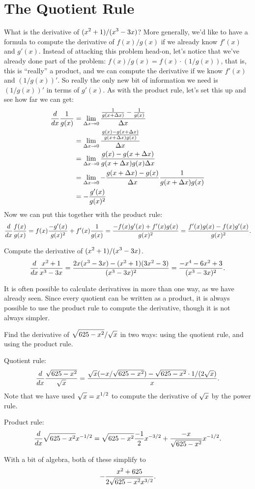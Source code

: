 \section{The Quotient Rule}{}{}
\nobreak
{}
What is the derivative of $\displaystyle (x^2+1)/(x^3-3x)$? More generally, we'd
like to have a formula to compute the derivative of $f(x)/g(x)$ if we
already know $f'(x)$ and $g'(x)$. Instead of attacking this problem
head-on, let's notice that we've already done part of the problem:
$f(x)/g(x)= f(x)\cdot(1/g(x))$, that is, this is ``really'' a product,
and we can compute the derivative if we know $f'(x)$ and
$(1/g(x))'$. So really the only new bit of information we need is
$(1/g(x))'$ in terms of $g'(x)$. As with the product rule, let's set
this up and see how far we can get:
\begin{align*}
{d\over dx}{1\over g(x)}&=\lim_{\Delta x\to0} 
{{1\over g(x+\Delta x)}-{1\over g(x)}\over\Delta x} \\
&=\lim_{\Delta x\to0} {{g(x)-g(x+\Delta x)\over g(x+\Delta x)g(x)}\over\Delta x} \\
&=\lim_{\Delta x\to0} {g(x)-g(x+\Delta x)\over g(x+\Delta x)g(x)\Delta x} \\
&=\lim_{\Delta x\to0} -{g(x+\Delta x)-g(x)\over \Delta x}
 {1\over g(x+\Delta x)g(x)} \\
&=-{g'(x)\over g(x)^2} \\
\end{align*}
Now we can put this together with the product rule:
$${d\over dx}{f(x)\over g(x)}=f(x){-g'(x)\over g(x)^2}+f'(x){1\over
  g(x)}={-f(x)g'(x)+f'(x)g(x)\over g(x)^2}=
  {f'(x)g(x)-f(x)g'(x)\over g(x)^2}.
$$

\begin{example}
Compute the derivative of $\displaystyle (x^2+1)/(x^3-3x)$.
$${d\over dx}{x^2+1\over
  x^3-3x}={2x(x^3-3x)-(x^2+1)(3x^2-3)\over(x^3-3x)^2}=
  {-x^4-6x^2+3\over (x^3-3x)^2}.
$$
\vskip-10pt
\end{example}

It is often possible to calculate derivatives in more than one way, as
we have already seen. Since every quotient can be written as a
product, it is always possible to use the product rule to compute the
derivative, though it is not always simpler.

\begin{example}
Find the derivative of $\displaystyle \sqrt{625-x^2}/\sqrt{x}$ in two ways: using the
quotient rule, and using the product rule.

Quotient rule:
$${d\over dx}{\sqrt{625-x^2}\over\sqrt{x}} = 
{\sqrt{x}(-x/\sqrt{625-x^2})-\sqrt{625-x^2}\cdot 1/(2\sqrt{x})\over
x}.$$
Note that we have used $\displaystyle \sqrt{x}=x^{1/2}$ to compute the derivative of
$\displaystyle \sqrt{x}$ by the power rule.

Product rule:
$${d\over dx}\sqrt{625-x^2} x^{-1/2} = 
\sqrt{625-x^2} {-1\over 2}x^{-3/2}+{-x\over \sqrt{625-x^2}}x^{-1/2}.
$$

With a bit of algebra, both of these simplify to
$$-{x^2+625\over 2\sqrt{625-x^2}x^{3/2}}.$$

\end{example}

